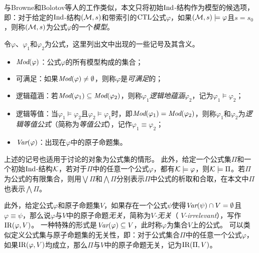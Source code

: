 与Browne和Bolotov等人的工作类似，本文只将初始$\textrm{Ind}$-结构作为模型的候选项\cite{browne1988characterizing,DBLP:journals/jetai/BolotovF99}，即：对于给定的$\textrm{Ind}$-结构$({\cal M},s)$和带索引的$\textrm{CTL}$公式$\varphi$，如果$({\cal M},s)\models \varphi$且$s = s_0$，则称$({\cal M},s)$为公式$\varphi$的一个\emph{模型}。



令$\varphi$、$\varphi_1$和$\varphi_2$为公式，这里列出文中出现的一些记号及其含义。
\begin{itemize}
	\item $\textit{Mod}(\varphi)$：公式$\varphi$的所有模型构成的集合；
	\item 可满足：如果$\textit{Mod}(\varphi)\not = \emptyset$，则称$\varphi$是\emph{可满足}的；
	\item 逻辑蕴涵：若$\textit{Mod}(\varphi_1)\subseteq \textit{Mod}(\varphi_2)$，则称$\varphi_1$\emph{逻辑地蕴涵}$\varphi_2$，记为$\varphi_1\models \varphi_2$；
	\item 逻辑等值：当$\varphi_1\models \varphi_2$且$\varphi_2\models \varphi_1$时，即$\textit{Mod}(\varphi_1)= \textit{Mod}(\varphi_2)$，则称$\varphi_1$和$\varphi_2$为\emph{逻辑等值公式}（简称为\emph{等值公式}），记作$\varphi_1 \equiv \varphi_2$；
	\item $\textit{Var}(\varphi)$：出现在$\varphi$中的原子命题集。
\end{itemize}


上述的记号也适用于讨论的对象为公式集的情形。
此外，给定一个公式集$\Pi$和一个初始$\textrm{Ind}$-结构$\cal K$，若对于$\Pi$中的任意一个公式$\varphi$，都有${\cal K} \models \varphi$，则${\cal K} \models \Pi$。若$\Pi$为公式的有限集合，则用$\bigvee \Pi$和$\bigwedge \Pi$分别表示$\Pi$中公式的析取和合取，在本文中$\Pi$也表示$\bigwedge \Pi$。

此外，给定公式$\varphi$和原子命题集$V$，如果存在一个公式$\psi$使得$\textit{Var}(\psi) \cap V = \emptyset$且$\varphi \equiv \psi$，那么说$\varphi$与$V$中的原子命题\emph{无关}，简称为\emph{$V$-无关}（ \emph{$V$-irrelevant}），写作$\textrm{IR}(\varphi,V)$。
一种特殊的形式是$\textit{Var}(\varphi) \subseteq V$，此时称$\varphi$为集合$V$上的公式。
可以类似定义公式集与原子命题集的无关性，即：对于公式集合$\Pi$中的任意一个公式$\varphi$，如果$\textrm{IR}(\varphi,V)$均成立，那么$\Pi$与$V$中的原子命题无关，记为$\textrm{IR}(\Pi,V)$。

